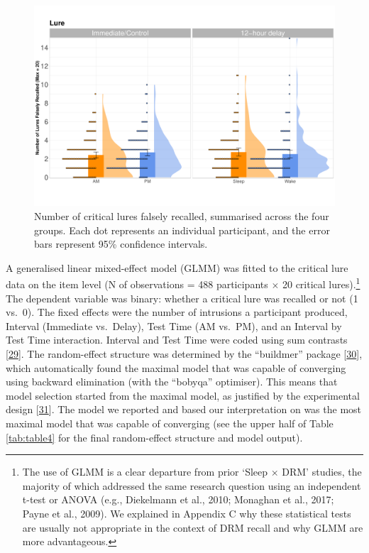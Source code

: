 \documentclass[
]{article}
\begin{document}
\begin{figure}

{\centering \includegraphics{Figures/luregraph} 

}

\caption{Number of critical lures falsely recalled, summarised across the four groups. Each dot represents an individual participant, and the error bars represent 95\% confidence intervals.}\label{fig:lurefig}
\end{figure}

A generalised linear mixed-effect model (GLMM) was fitted to the critical lure data on the item level (N of observations = 488 participants \(\times\) 20 critical lures).\footnote{The use of GLMM is a clear departure from prior ‘Sleep $\times$ DRM’ studies, the majority of which addressed the same research question using an independent t-test or ANOVA (e.g., Diekelmann et al., 2010; Monaghan et al., 2017; Payne et al., 2009). We explained in Appendix C why these statistical tests are usually not appropriate in the context of DRM recall and why GLMM are more advantageous.} The dependent variable was binary: whether a critical lure was recalled or not (1 vs.~0). The fixed effects were the number of intrusions a participant produced, Interval (Immediate vs.~Delay), Test Time (AM vs.~PM), and an Interval by Test Time interaction. Interval and Test Time were coded using sum contrasts {[}\protect\hyperlink{ref-barr2019a}{29}{]}. The random-effect structure was determined by the ``buildmer'' package {[}\protect\hyperlink{ref-voeten2021a}{30}{]}, which automatically found the maximal model that was capable of converging using backward elimination (with the ``bobyqa'' optimiser). This means that model selection started from the maximal model, as justified by the experimental design {[}\protect\hyperlink{ref-barr2013a}{31}{]}. The model we reported and based our interpretation on was the most maximal model that was capable of converging (see the upper half of Table \ref{tab:table4} for the final random-effect structure and model output).
\end{document}
